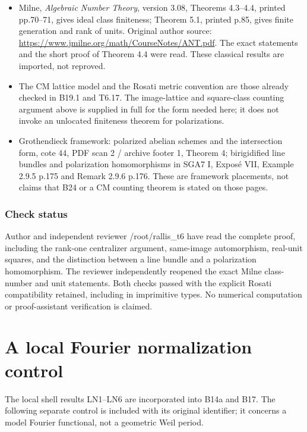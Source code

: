 \documentclass[11pt,a4paper]{article}
\providecommand{\tightlist}{\setlength{\itemsep}{0pt}\setlength{\parskip}{0pt}}
\theoremstyle{definition}
\begin{document}
\begin{itemize}
\tightlist
\item
  Milne, \emph{Algebraic Number Theory}, version 3.08, Theorems
  4.3--4.4, printed pp.70--71, gives ideal class finiteness; Theorem
  5.1, printed p.85, gives finite generation and rank of units. Original
  author source: \url{https://www.jmilne.org/math/CourseNotes/ANT.pdf}.
  The exact statements and the short proof of Theorem 4.4 were read.
  These classical results are imported, not reproved.
\item
  The CM lattice model and the Rosati metric convention are those
  already checked in B19.1 and T6.17. The image-lattice and square-class
  counting argument above is supplied in full for the form needed here;
  it does not invoke an unlocated finiteness theorem for polarizations.
\item
  Grothendieck framework: polarized abelian schemes and the intersection
  form, cote 44, PDF scan 2 / archive footer 1, Theorem 4; birigidified
  line bundles and polarization homomorphisms in SGA7 I, Exposé VII,
  Example 2.9.5 p.175 and Remark 2.9.6 p.176. These are framework
  placements, not claims that B24 or a CM counting theorem is stated on
  those pages.
\end{itemize}

\subsubsection{Check status}\label{bounded-core-moduli-check-status}

Author and independent reviewer /root/rallis\_t6 have read the complete
proof, including the rank-one centralizer argument, same-image
automorphism, real-unit squares, and the distinction between a line
bundle and a polarization homomorphism. The reviewer independently
reopened the exact Milne class-number and unit statements. Both checks
passed with the explicit Rosati compatibility retained, including in
imprimitive types. No numerical computation or proof-assistant
verification is claimed.

\section{A local Fourier normalization control}

The local shell results LN1--LN6 are incorporated into B14a and B17. The
following separate control is included with its original identifier; it
concerns a model Fourier functional, not a geometric Weil period.
\end{document}
